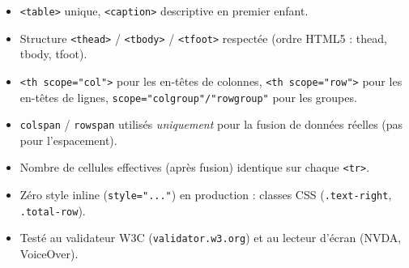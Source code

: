 \documentclass[11pt]{article}
\begin{document}
\begin{aretenir}
\begin{itemize}
    \item \texttt{<table>} unique, \texttt{<caption>} descriptive en premier enfant.
    \item Structure \texttt{<thead>} / \texttt{<tbody>} / \texttt{<tfoot>} respectée (ordre HTML5 : thead, tbody, tfoot).
    \item \texttt{<th scope="col">} pour les en-têtes de colonnes, \texttt{<th scope="row">} pour les en-têtes de lignes, \texttt{scope="colgroup"/"rowgroup"} pour les groupes.
    \item \texttt{colspan} / \texttt{rowspan} utilisés \emph{uniquement} pour la fusion de données réelles (pas pour l'espacement).
    \item Nombre de cellules effectives (après fusion) identique sur chaque \texttt{<tr>}.
    \item Zéro style inline (\texttt{style="..."}) en production : classes CSS (\texttt{.text-right}, \texttt{.total-row}).
    \item Testé au validateur W3C (\texttt{validator.w3.org}) et au lecteur d'écran (NVDA, VoiceOver).
\end{itemize}
\end{aretenir}
\end{document}
